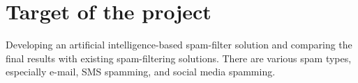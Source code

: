 ﻿\section{Target of the project}
Developing an artificial intelligence-based spam-filter solution and comparing the final results with existing spam-filtering solutions. There are various spam types, especially e-mail, SMS spamming, and social media spamming.